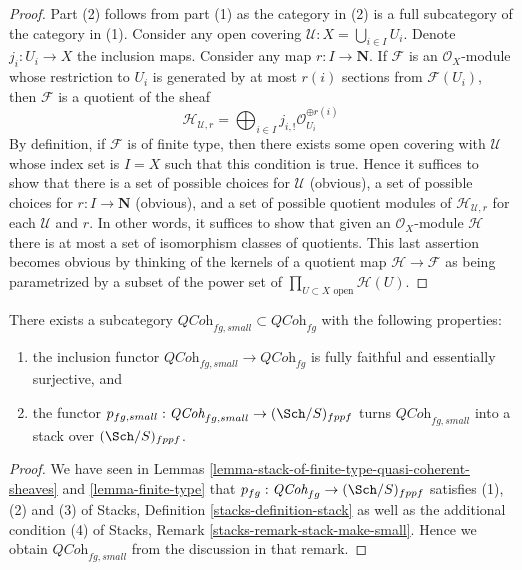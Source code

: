 \begin{proof}
Part (2) follows from part (1) as the category in (2) is a full subcategory
of the category in (1). Consider any open covering
$\mathcal{U} : X = \bigcup_{i \in I} U_i$. Denote $j_i : U_i \to X$
the inclusion maps. Consider any map $r : I \to \mathbf{N}$.
If $\mathcal{F}$ is an $\mathcal{O}_X$-module whose restriction to
$U_i$ is generated by at most $r(i)$ sections from $\mathcal{F}(U_i)$,
then $\mathcal{F}$ is a quotient of the sheaf
$$
\mathcal{H}_{\mathcal{U}, r} =
\bigoplus\nolimits_{i \in I} j_{i, !}\mathcal{O}_{U_i}^{\oplus r(i)}
$$
By definition, if $\mathcal{F}$ is of finite type, then there exists
some open covering with $\mathcal{U}$ whose index set is $I = X$
such that this condition is true. Hence it suffices to show that
there is a set of possible choices for $\mathcal{U}$ (obvious),
a set of possible choices for $r : I \to \mathbf{N}$ (obvious), and
a set of possible quotient modules of $\mathcal{H}_{\mathcal{U}, r}$
for each $\mathcal{U}$ and $r$. In other words, it suffices to show
that given an $\mathcal{O}_X$-module $\mathcal{H}$ there is at most
a set of isomorphism classes of quotients.
This last assertion becomes obvious
by thinking of the kernels of a quotient map
$\mathcal{H} \to \mathcal{F}$
as being parametrized by a subset of the power set of
$\prod_{U \subset X\text{ open}} \mathcal{H}(U)$.
\end{proof}

\begin{lemma}
\label{lemma-stack-fg-quasi-coherent}
There exists a subcategory
$\textit{QCoh}_{fg, small} \subset \textit{QCoh}_{fg}$
with the following properties:
\begin{enumerate}
\item the inclusion functor
$\textit{QCoh}_{fg, small} \to \textit{QCoh}_{fg}$ is
fully faithful and essentially surjective, and
\item the functor
$p_{fg, small} : \textit{QCoh}_{fg, small} \to (\Sch/S)_{fppf}$
turns $\textit{QCoh}_{fg, small}$ into a stack over $(\Sch/S)_{fppf}$.
\end{enumerate}
\end{lemma}

\begin{proof}
We have seen in
Lemmas \ref{lemma-stack-of-finite-type-quasi-coherent-sheaves} and
\ref{lemma-finite-type}
that $p_{fg} : \textit{QCoh}_{fg} \to (\Sch/S)_{fppf}$
satisfies (1), (2) and (3) of
Stacks, Definition \ref{stacks-definition-stack}
as well as the additional condition (4) of
Stacks, Remark \ref{stacks-remark-stack-make-small}.
Hence we obtain $\textit{QCoh}_{fg, small}$ from the discussion
in that remark.
\end{proof}

